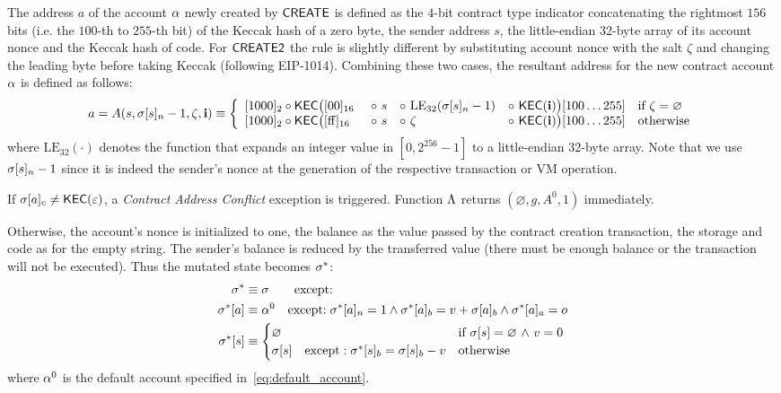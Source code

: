 The address $a$ of the account $\mathbf{\alpha}$ newly created by {\hyperlink{create}{$\mathsf{CREATE}$}} is defined as the $4$-bit contract type indicator concatenating the rightmost $156$ bits (i.e. the $100$-th to $255$-th bit) of the Keccak hash of a zero byte, the sender address $s$, the little-endian 32-byte array of its account nonce and the Keccak hash of \cvm code. 
% 
For {\hyperlink{create2}{$\mathsf{CREATE2}$}} the rule is slightly different by substituting account nonce with the salt $\zeta$ and changing the leading byte before taking Keccak (following EIP-1014).
Combining these two cases, 
the resultant address for the new contract account $\mathbf{\alpha}$ is defined as follows:
\begin{align}\label{eq:new-address}
	a= A(s, \st[s]_{n} - 1, \zeta, \vec{i}) \eqdef 
	\left\{\begin{array}{l l l l l}
	 	\typecontract \circ \kec\big([\mathrm{00}]_{16} &~\circ~ s &\circ~ \mathrm{LE}_{32}(\st[s]_n-1) &\circ~ \kec(\vec{i}) \big)[100 \dots 255]
	 	& \text{if}\ \zeta = \varnothing \\
	 	\typecontract \circ \kec\big([\mathrm{ff}]_{16} &~\circ~ s &\circ~  \zeta   &\circ~ \kec(\vec{i}) \big)[100 \dots 255] 
		& \text{otherwise}
	\end{array} \right.
\end{align}
where $\mathrm{LE}_{32}(\cdot)$ denotes the function that expands an integer value in $[0,2^{256}-1]$ to a little-endian 32-byte array. 
%
Note that we use $\mathbf{\sigma}[s]_n-1$ since it is indeed the sender's nonce at the generation of the respective transaction or VM operation. 

If $\mathbf{\sigma}[a]_c\neq \mathsf{KEC}(\mathbb{\varepsilon})$, a \emph{Contract Address Conflict} exception is triggered. Function $\mathrm{\Lambda}$ returns $(\varnothing,g,A^0,1)$ immediately. 

Otherwise, the account's nonce is initialized to one, the balance as the value passed by the contract creation transaction,
the storage and code as for the empty string.
The sender's balance is reduced by the transferred value (there must be enough balance or the transaction will not be executed).
Thus the mutated state becomes $\mathbf{\sigma}^*$:
\begin{align}
	\mathbf{\sigma}^* & \equiv \mathbf{\sigma} \qquad{ \text{except:}}\\
	\mathbf{\sigma}^*[a] &\equiv \mathbf{\alpha}^0 \quad\text{except:}\; \mathbf{\sigma}^*[a]_n=1 \wedge \mathbf{\sigma}^*[a]_b=v+\mathbf{\sigma}[a]_b \wedge \mathbf{\sigma}^*[a]_a=o\\
	\mathbf{\sigma}^*[s] &\equiv \begin{cases}
		\varnothing & \mbox{if $\mathbf{\sigma}[s]=\varnothing$ $\land$ $v=0$}\\
		\mathbf{\sigma}[s]\quad\mbox{except}:	\mathbf{\sigma}^*[s]_b=\mathbf{\sigma}[s]_b-v	& \mbox{otherwise}
	\end{cases}
\end{align}
where $\mathbf{\alpha}^0$ is the default account specified in~\cref{eq:default_account}. 


